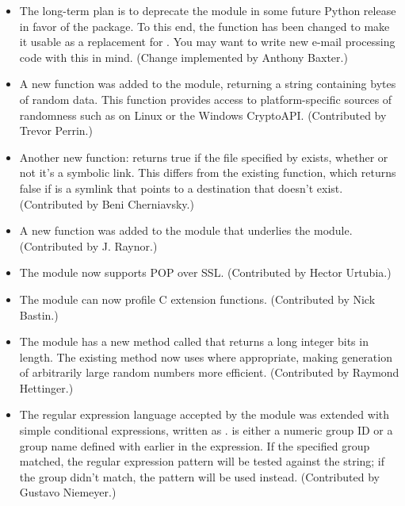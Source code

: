 \documentclass{howto}
\begin{document}
\begin{itemize}
\item The long-term plan is to deprecate the  module
in some future Python release in favor of the  package.
To this end, the  function has been
changed to make it usable as a replacement for
.  You may want to write new e-mail
processing code with this in mind.  (Change implemented by Anthony
Baxter.)

\item A new  function was added to the
 module, returning a string containing  bytes of
random data.  This function provides access to platform-specific
sources of randomness such as  on Linux or the
Windows CryptoAPI.  (Contributed by Trevor Perrin.)

\item Another new function:  
returns true if the file specified by  exists, whether or
not it's a symbolic link.  This differs from the existing
 function, which returns false if 
 is a symlink that points to a destination that doesn't exist.
(Contributed by Beni Cherniavsky.)

\item A new  function was added to the
 module that underlies the  module.
(Contributed by J. Raynor.)

\item The  module now supports POP over SSL.  (Contributed by
Hector Urtubia.)

\item The  module can now profile C extension functions.
(Contributed by Nick Bastin.)

\item The  module has a new method called
    that returns a long integer 
   bits in length.  The existing  method now uses
    where appropriate, making generation of
   arbitrarily large random numbers more efficient.  (Contributed by
   Raymond Hettinger.)

\item The regular expression language accepted by the  module
   was extended with simple conditional expressions, written as
   .   is either a
   numeric group ID or a group name defined with  
   earlier in the expression.  If the specified group matched, the
   regular expression pattern  will be tested against the string; if
   the group didn't match, the pattern  will be used instead.
   (Contributed by Gustavo Niemeyer.)


\end{itemize}
\end{document}
